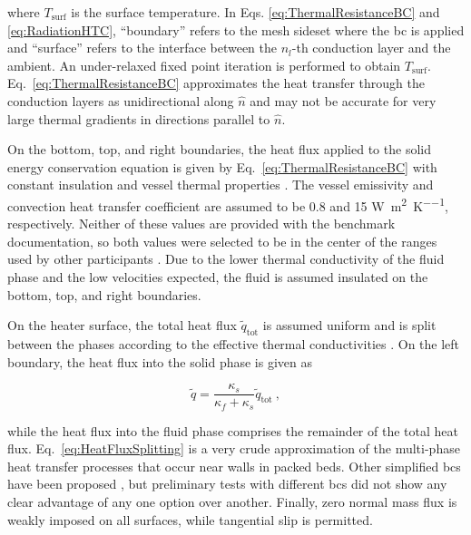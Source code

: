 \noindent where \(T_\text{surf}\) is the surface temperature. In Eqs. \eqref{eq:ThermalResistanceBC} and \eqref{eq:RadiationHTC}, ``boundary'' refers to the mesh sideset where the \gls{bc} is applied and ``surface'' refers to the interface between the \(n_l\)-th conduction layer and the ambient. An under-relaxed fixed point iteration is performed to obtain \(T_\text{surf}\). Eq.\ \eqref{eq:ThermalResistanceBC} approximates the heat transfer through the conduction layers as unidirectional along \(\hat{n}\) and may not be accurate for very large thermal gradients in directions parallel to \(\hat{n}\).

On the bottom, top, and right boundaries, the heat flux applied to the solid energy conservation equation is given by Eq.\ \eqref{eq:ThermalResistanceBC} with constant insulation and vessel thermal properties \cite{SANA}. The vessel emissivity and convection heat transfer coefficient are assumed to be 0.8 and 15 \si{\watt\per\square\meter\per\kelvin}, respectively. Neither of these values are provided with the benchmark documentation, so both values were selected to be in the center of the ranges used by other participants \cite{rousseau,baggemann,becker2003,lim,tecdoc1163}. Due to the lower thermal conductivity of the fluid phase and the low velocities expected, the fluid is assumed insulated on the bottom, top, and right boundaries.

On the heater surface, the total heat flux \(\tilde{q}_\text{tot}\) is assumed uniform and is split between the phases according to the effective thermal conductivities \cite{alazmi}. On the left boundary, the heat flux into the solid phase is given as

\begin{equation}
\label{eq:HeatFluxSplitting}
\tilde{q}=\frac{\kappa_s}{\kappa_f+\kappa_s} \tilde{q}_\text{tot}\ ,
\end{equation}

\noindent while the heat flux into the fluid phase comprises the remainder of the total heat flux. Eq.\ \eqref{eq:HeatFluxSplitting} is a very crude approximation of the multi-phase heat transfer processes that occur near walls in packed beds. Other simplified \glspl{bc} have been proposed \cite{alazmi}, but preliminary tests with different \glspl{bc} did not show any clear advantage of any one option over another. Finally, zero normal mass flux is weakly imposed on all surfaces, while tangential slip is permitted. 

